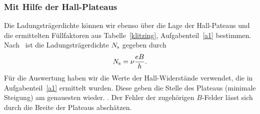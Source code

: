 \documentclass[paper=a4,fontsize=10pt,DIV=18,twocolumn,parskip=half]{scrartcl}
\numberwithin{equation}{section}    %
\begin{document}
\subsubsection*{Mit Hilfe der Hall-Plateaus}
Die Ladungsträgerdichte können wir ebenso über die Lage der Hall-Pateaus und die ermittelten Füllfaktoren aus Tabelle~\ref{klitzing}, Aufgabenteil~\ref{a1} bestimmen. Nach~\citet{anleitung} ist die Ladungsträgerdichte $N_{\rm s}$ gegeben durch
\begin{equation}
	N_{\rm s} = \nu\frac{e B}{h}.
\end{equation}
Für die Auswertung haben wir die Werte der Hall-Widerstände verwendet, die in Aufgabenteil~\ref{a1} ermittelt wurden. Diese geben die Stelle des Plateaus (minimale Steigung) am genauesten wieder. . Der Fehler der zugehörigen $B$-Felder lässt sich durch die Breite der Plateaus abschätzen. %
\end{document}
